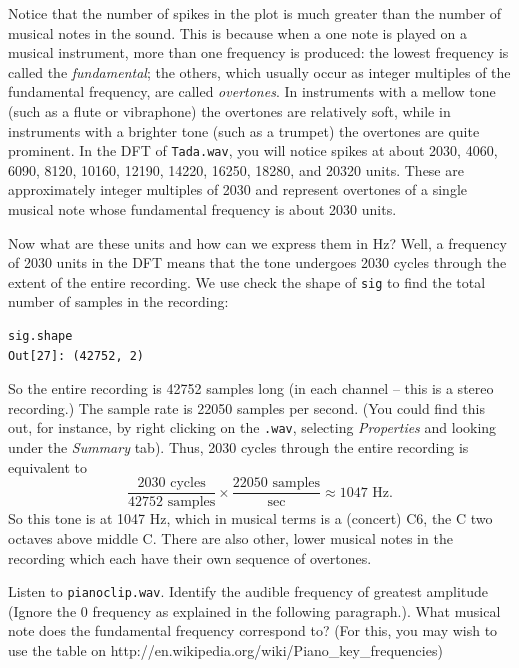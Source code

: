 Notice that the number of spikes in the plot is much greater than the number of musical notes in the sound. This is because when a one note is played on a musical instrument, more than one frequency is produced: the lowest frequency is called the \emph{fundamental}; the others, which usually occur as integer multiples of the fundamental frequency, are called \emph{overtones}. In instruments with a mellow tone (such as a flute or vibraphone) the overtones are relatively soft, while in instruments with a brighter tone (such as a trumpet) the overtones are quite prominent. In the DFT of \texttt{Tada.wav}, you will notice spikes at about 2030, 4060, 6090, 8120, 10160, 12190, 14220, 16250, 18280, and 20320 units. These are approximately integer multiples of 2030 and represent overtones of a single musical note whose fundamental frequency is about 2030 units.

Now what are these units and how can we express them in Hz? Well, a frequency of 2030 units in the DFT means that the tone undergoes 2030 cycles through the extent of the entire recording. We use check the shape of \texttt{sig} to find the total number of samples in the recording:
\begin{verbatim}
sig.shape
Out[27]: (42752, 2)
\end{verbatim}
So the entire recording is 42752 samples long (in each channel -- this is a stereo recording.) The sample rate is 22050 samples per second. (You could find this out, for instance, by right clicking on the \texttt{.wav}, selecting \emph{Properties} and looking under the \emph{Summary} tab).  Thus, 2030 cycles through the entire recording is equivalent to
$$\frac{2030\text{ cycles}}{42752\text{ samples}} \times \frac{22050\text{ samples}}{\text{sec}} \approx 1047 \text{ Hz}.$$
So this tone is at 1047 Hz, which in musical terms is a (concert) C6, the C two octaves above middle C. There are also other, lower musical notes in the recording which each have their own sequence of overtones.

\begin{problem}
Listen to \texttt{pianoclip.wav}. Identify the audible frequency of greatest amplitude (Ignore the 0 frequency as explained in the following paragraph.).  What musical note does the fundamental frequency correspond to? (For this, you may wish to use the table on http://en.wikipedia.org/wiki/Piano\_key\_frequencies)
\end{problem}

